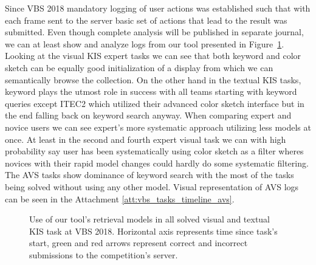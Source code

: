 Since VBS 2018 mandatory logging of user actions was established such that with each frame sent to the server basic set of actions that lead to the result was submitted. Even though complete analysis will be published in separate journal, we can at least show and analyze logs from our tool presented in Figure~\ref{fig:vbs_tasks_timeline}. Looking at the visual KIS expert tasks we can see that both keyword and color sketch can be equally good initialization of a display from which we can semantically browse the collection. On the other hand in the textual KIS tasks, keyword plays the utmost role in success with all teams starting with keyword queries except ITEC2 which utilized their advanced color sketch interface but in the end falling back on keyword search anyway. When comparing expert and novice users we can see expert's more systematic approach utilizing less models at once. At least in the second and fourth expert visual task we can with high probability say user has been systematically using color sketch as a filter wheres novices with their rapid model changes could hardly do some systematic filtering. The AVS tasks show dominance of keyword search with the most of the tasks being solved without using any other model. Visual representation of AVS logs can be seen in the Attachment \ref{att:vbs_tasks_timeline_avs}.

\begin{figure}
	\centering
	
	
	\caption[Use of tool's retrieval models in KIS tasks]{Use of our tool's retrieval models in all solved visual and textual KIS task at VBS 2018. Horizontal axis represents time since task's start, green and red arrows represent correct and incorrect submissions to the competition's server.}
	\label{fig:vbs_tasks_timeline}
\end{figure}
